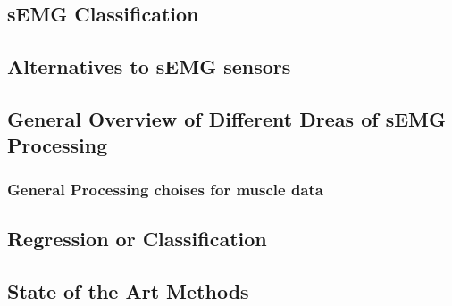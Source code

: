 \documentclass[../main.tex]{subfiles}
\begin{document}
\subsection{sEMG Classification}

\subsection{Alternatives to sEMG sensors}

\subsection{General Overview of Different Dreas of sEMG Processing}


\subsubsection{General Processing choises for muscle data}

\subsection{Regression or Classification}


\subsection{State of the Art Methods}


\end{document}
